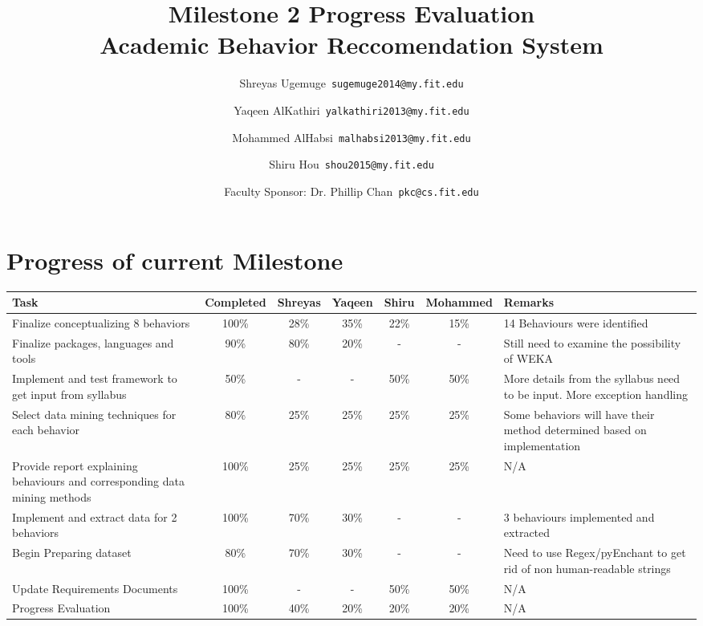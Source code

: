 \documentclass[12pt]{article}
\begin{document}
	\title{\textbf{Milestone 2 Progress Evaluation} \\ \hfill \break
	Academic Behavior Reccomendation System}
	\author{Shreyas Ugemuge\      \texttt{sugemuge2014@my.fit.edu}
  \and
  Yaqeen AlKathiri\      \texttt{yalkathiri2013@my.fit.edu}
  \and
	Mohammed AlHabsi\      \texttt{malhabsi2013@my.fit.edu}
  \and
  Shiru Hou\      \texttt{shou2015@my.fit.edu}
  \and
  Faculty Sponsor: Dr. Phillip Chan\      \texttt{pkc@cs.fit.edu}}
	\maketitle
	\pagebreak
	\singlespacing
	\tableofcontents
	\pagebreak
	\section{Progress of current Milestone}
	\begin{adjustbox}{totalheight=\baselineskip}
	\begin{tabularx}{\textwidth}{|X|c|c|c|c|c|X|}
	\hline
		\textbf{Task} & \textbf{Completed} &\textbf{Shreyas} & \textbf{Yaqeen} & \textbf{Shiru} & \textbf{Mohammed} & \textbf{Remarks}  \\
		\hline
		Finalize conceptualizing 8 behaviors & 100\% & 28\% & 35\% & 22\% & 15\% & 14 Behaviours were identified \\ \hline
		Finalize packages, languages and tools & 90\% & 80\% & 20\% & - & - & Still need to examine the possibility of WEKA \\ \hline
		Implement and test framework to get input from syllabus & 50\% & - & - & 50\% & 50\% & More details from the syllabus need to be input. More exception handling\\ \hline
		Select data mining techniques for each behavior & 80\% & 25\% & 25\% & 25\% & 25\% & Some behaviors will have their method determined based on implementation\\ \hline
		Provide report explaining behaviours and corresponding data mining methods & 100\% &25\% & 25\% & 25\% & 25\% & N/A\\ \hline
		Implement and extract data for 2 behaviors & 100\% &70\% & 30\% & - & - & 3 behaviours implemented and extracted\\ \hline
		Begin Preparing dataset & 80\% & 70\% & 30\% & - & - & Need to use Regex/pyEnchant to get rid of non human-readable strings \\  \hline
		Update Requirements Documents & 100\% & - & - & 50\% & 50\% & N/A \\ \hline
		Progress Evaluation & 100\% & 40\% & 20\% & 20\% & 20\% & N/A \\ \hline 
	\end{tabularx}
	\end{adjustbox}
\end{document}

